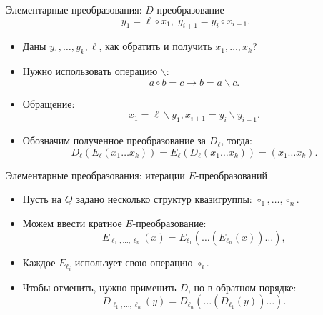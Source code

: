 \begin{frame}{Элементарные преобразования: $D$-преобразование}
    \[
        y_1 = \ell \circ x_1, \; y_{i+1} = y_i \circ x_{i+1}.
    \]
    \begin{itemize}
        \item Даны $y_1, \ldots, y_k, \ell$, как обратить и получить $x_1, \ldots, x_k$?
        \pause 
        \item Нужно использовать операцию $\backslash$:
        \[
            a \circ b = c \rightarrow b = a \backslash c.
        \]
        \pause 
        \item Обращение:
        \[
            x_1 = \ell \backslash y_1, x_{i+1} = y_i \backslash y_{i+1}.
        \]
        \pause 
        \item Обозначим полученное преобразование за $D_{\ell}$, тогда:
        \[
            D_{\ell} \left( E_{\ell}(x_1 \ldots x_k) \right) = E_{\ell} \left( D_{\ell} (x_1 \ldots x_k) \right) = (x_1 \ldots x_k).
        \]
    \end{itemize}
\end{frame}


\begin{frame}{Элементарные преобразования: итерации $E$-преобразований}
    \begin{itemize}
        \item Пусть на $Q$ задано несколько структур квазигруппы: $\circ_1, \ldots, \circ_n$.
        \pause
        \item Можем ввести кратное $E$-преобразование:
        \[
            E_{\ell_1, \ldots, \ell_n}(x) = E_{\ell_1} \left( \ldots \left( E_{\ell_n} (x) \right) \ldots \right), 
        \]
        \pause
        \item Каждое $E_{\ell_i}$ использует свою операцию $\circ_i$.
        \pause
        \item Чтобы  \guillemotleft отменить\guillemotright, нужно применить $D$, но в обратном порядке:
        \pause
        \[
            D_{\ell_1, \ldots, \ell_n}(y) = D_{\ell_n} \left( \ldots \left( D_{\ell_1} (y) \right) \ldots \right).
        \]
    \end{itemize}
\end{frame}


